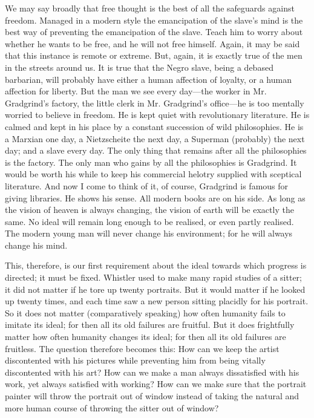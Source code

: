 \documentclass{book}
\begin{document}
We may say broadly that free thought is the best of all the safeguards against freedom. Managed in a modern style the emancipation of the slave’s mind is the best way of preventing the emancipation of the slave. Teach him to worry about whether he wants to be free, and he will not free himself. Again, it may be said that this instance is remote or extreme. But, again, it is exactly true of the men in the streets around us. It is true that the Negro slave, being a debased barbarian, will probably have either a human affection of loyalty, or a human affection for liberty. But the man we see every day—the worker in Mr. Gradgrind’s factory, the little clerk in Mr. Gradgrind’s office—he is too mentally worried to believe in freedom. He is kept quiet with revolutionary literature. He is calmed and kept in his place by a constant succession of wild philosophies. He is a Marxian one day, a Nietzscheite the next day, a Superman (probably) the next day; and a slave every day. The only thing that remains after all the philosophies is the factory. The only man who gains by all the philosophies is Gradgrind. It would be worth his while to keep his commercial helotry supplied with sceptical literature. And now I come to think of it, of course, Gradgrind is famous for giving libraries. He shows his sense. All modern books are on his side. As long as the vision of heaven is always changing, the vision of earth will be exactly the same. No ideal will remain long enough to be realised, or even partly realised. The modern young man will never change his environment; for he will always change his mind.

This, therefore, is our first requirement about the ideal towards which progress is directed; it must be fixed. Whistler used to make many rapid studies of a sitter; it did not matter if he tore up twenty portraits. But it would matter if he looked up twenty times, and each time saw a new person sitting placidly for his portrait. So it does not matter (comparatively speaking) how often humanity fails to imitate its ideal; for then all its old failures are fruitful. But it does frightfully matter how often humanity changes its ideal; for then all its old failures are fruitless. The question therefore becomes this: How can we keep the artist discontented with his pictures while preventing him from being vitally discontented with his art? How can we make a man always dissatisfied with his work, yet always satisfied with working? How can we make sure that the portrait painter will throw the portrait out of window instead of taking the natural and more human course of throwing the sitter out of window?
\end{document}
